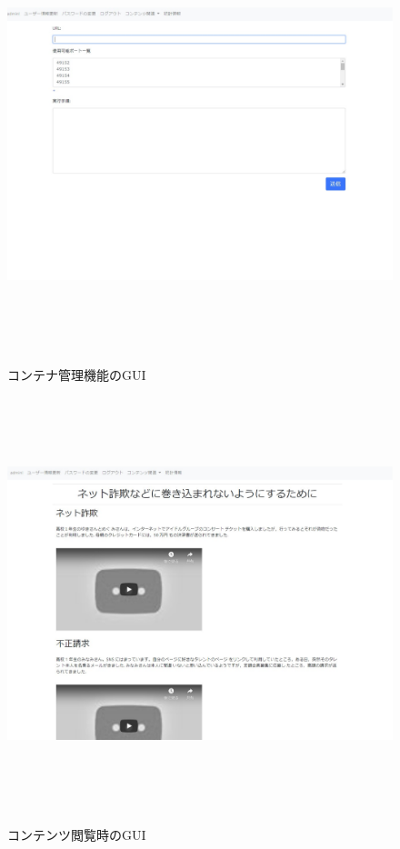 \begin{figure}[htbp]
    \begin{center}
        \includegraphics[width=13cm,height=12cm,keepaspectratio]{container_management-crop.pdf}\\
    \end{center}
    \caption{コンテナ管理機能のGUI}
    \label{kanri}
\end{figure}

\begin{figure}[htbp]
    \begin{center}
        \includegraphics[width=13cm,height=12cm,keepaspectratio]{naiyou-crop.pdf}\\
    \end{center}
    \caption{コンテンツ閲覧時のGUI}
    \label{naiyou}
\end{figure}

